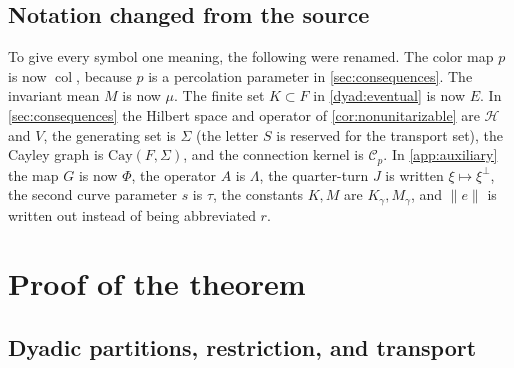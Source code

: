 \documentclass[11pt]{article}
\newcommand{\norm}[1]{\lVert #1\rVert}
\DeclareMathOperator{\colr}{col}
\theoremstyle{definition}
\numberwithin{equation}{section}
\begin{document}
\subsection{Notation changed from the source}

To give every symbol one meaning, the following were renamed. The color map
\(p\) is now \(\colr\), because \(p\) is a percolation parameter in
\cref{sec:consequences}. The invariant mean \(M\) is now \(\mu\). The finite
set \(K\subset F\) in \cref{dyad:eventual} is now \(E\). In
\cref{sec:consequences} the Hilbert space and operator of
\cref{cor:nonunitarizable} are \(\mathcal H\) and \(V\), the generating set
is \(\Sigma\) (the letter \(S\) is reserved for the transport set), the
Cayley graph is \(\mathrm{Cay}(F,\Sigma)\), and the connection kernel is
\(\mathcal C_p\). In \cref{app:auxiliary} the map \(G\) is now \(\Phi\), the
operator \(A\) is \(\Lambda\), the quarter-turn \(J\) is written
\(\xi\mapsto\xi^\perp\), the second curve parameter \(s\) is \(\tau\), the
constants \(K,M\) are \(K_\gamma,M_\gamma\), and \(\norm{e}\) is written out
instead of being abbreviated \(r\).

\section{Proof of the theorem}\label{sec:proof}

\subsection{Dyadic partitions, restriction, and transport}\label{sec:dyadic}
\end{document}
